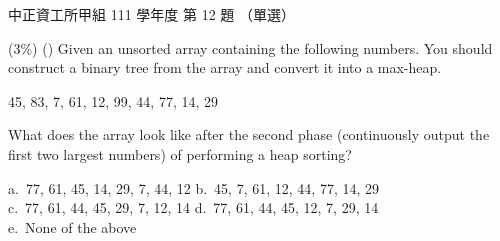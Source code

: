 \begin{pastexam}[label={px:ccu-111-swa-04}]{中正資工所甲組 111 學年度 第 12 題}
（單選）

(3\%) (\quad) Given an unsorted array containing the following numbers. You should construct a
binary tree from the array and convert it into a max-heap.
\begin{center}45, 83, 7, 61, 12, 99, 44, 77, 14, 29\end{center}
What does the array look like after the second phase (continuously output the first two largest
numbers) of performing a heap sorting?

a.~77, 61, 45, 14, 29, 7, 44, 12 \qquad b.~45, 7, 61, 12, 44, 77, 14, 29\\
c.~77, 61, 44, 45, 29, 7, 12, 14 \qquad d.~77, 61, 44, 45, 12, 7, 29, 14\\
e.~None of the above
\end{pastexam}

